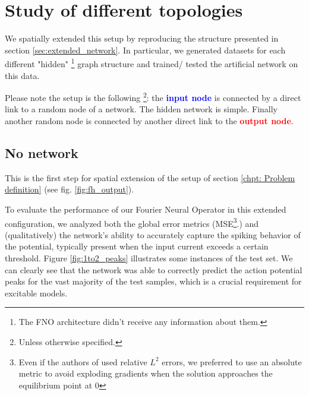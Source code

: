 \newpage






\section{Study of different topologies}
We spatially extended this setup by reproducing the structure presented in section \ref{sec:extended_network}. In particular, we generated datasets for each different "hidden" \footnote{The FNO architecture didn't receive any information about them.} graph structure and trained/ tested the artificial network on this data.


Please note the setup is the following \footnote{Unless otherwise specified.}: the \textcolor{blue}{\textbf{input node}} is connected by a direct link to a random node of a network. The hidden network is simple.
Finally another random node is connected by another direct link to the \textcolor{red}{\textbf{output node}}.





\subsection{No network}
This is the first step for spatial extension of the setup of section \ref{chpt: Problem definition} (see fig. \ref{fig:fh_output}). 

To evaluate the performance of our Fourier Neural Operator in this extended configuration, we analyzed both the global error metrics (MSE\footnote{Even if the authors of \cite{centofanti2024comconf} used relative $L^2$ errors, we preferred to use an absolute metric to avoid exploding gradients when the solution approaches the equilibrium point at $0$}.) and (qualitatively) the network's ability to accurately capture the spiking behavior of the potential, typically present when the input current exceeds a certain threshold. Figure \ref{fig:1to2_peaks} illustrates some instances of the test set. We can clearly see that the network was able to correctly predict the action potential peaks for the vast majority of the test samples, which is a crucial requirement for excitable models.

